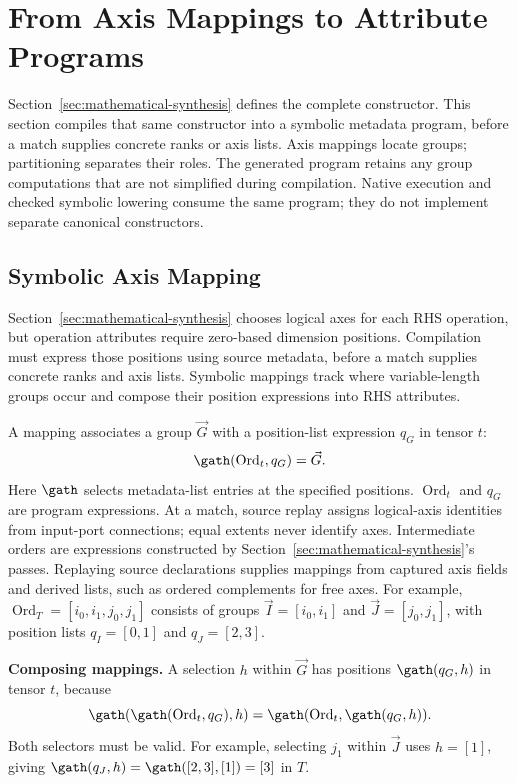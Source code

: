 \section{From Axis Mappings to Attribute Programs}
\label{sec:method}

Section~\ref{sec:mathematical-synthesis} defines the complete constructor.
This section compiles that same constructor into a symbolic metadata
program, before a match supplies concrete ranks or axis lists. Axis
mappings locate groups; partitioning separates their roles. The generated
program retains any group computations that are not simplified during
compilation. Native execution and checked symbolic lowering consume
the same program; they do not implement separate canonical constructors.

\subsection{Symbolic Axis Mapping}
\label{sec:symbolic-axis-mapping}
Section~\ref{sec:mathematical-synthesis} chooses logical axes for each RHS
operation, but operation attributes require zero-based dimension positions.
Compilation must express those positions using source metadata, before a
match supplies concrete ranks and axis lists. Symbolic mappings track where
variable-length groups occur and compose their position expressions into
RHS attributes.

A mapping associates a group $\vec G$ with a position-list expression $q_G$
in tensor $t$:
\begin{equation}
 \gath(\operatorname{Ord}_t,q_G)=\vec G.
 \label{eq:mapping}
\end{equation}
Here $\gath$ selects metadata-list entries at the specified positions.
$\operatorname{Ord}_t$ and $q_G$ are program expressions. At a match,
source replay assigns logical-axis identities from input-port connections;
equal extents never identify axes. Intermediate orders are expressions
constructed by Section~\ref{sec:mathematical-synthesis}'s passes.
Replaying source declarations supplies mappings from captured axis fields
and derived lists, such as ordered complements for free axes. For example,
$\operatorname{Ord}_T=[i_0,i_1,j_0,j_1]$ consists of groups
$\vec I=[i_0,i_1]$ and $\vec J=[j_0,j_1]$, with position lists
$q_I=[0,1]$ and $q_J=[2,3]$.

\noindent\textbf{Composing mappings.}
A selection $h$ within $\vec G$ has positions $\gath(q_G,h)$ in tensor
$t$, because
\begin{equation}
 \gath(\gath(\operatorname{Ord}_t,q_G),h)=\gath(\operatorname{Ord}_t,\gath(q_G,h)).
 \label{eq:gather-composition}
\end{equation}
Both selectors must be valid. For example, selecting $j_1$ within $\vec J$
uses $h=[1]$, giving $\gath(q_J,h)=\gath([2,3],[1])=[3]$ in $T$.

